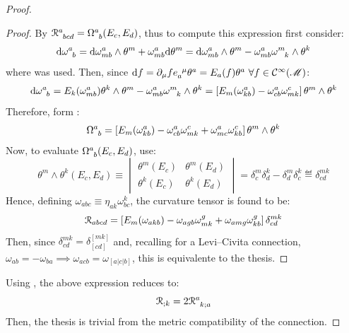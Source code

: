 \begin{proofbox}
\begin{proof}
    \begin{proofbox}
      \begin{proof}
        By  $ \tensor{\rr}{^a_{bcd}} = \tensor{\Omega}{^a_b}(E_c , E_d) $, thus to compute this expression first consider:
        \begin{equation*}
          \dd \tensor{\omega}{^a_b} = \dd \omega^a_{mb} \wedge \theta^m + \omega^a_{mb} \dd \theta^m = \dd \omega^a_{mb} \wedge \theta^m - \omega^a_{mb} \tensor{\omega}{^m_k} \wedge \theta^k
        \end{equation*}
        where  was used. Then, since $ \dd f = \pa_\mu f \tensor{e}{_a^\mu} \theta^a = E_a(f) \theta^a \,\, \forall f \in \cm $:
        \begin{equation*}
          \dd \tensor{\omega}{^a_b} = E_k(\omega^a_{mb}) \theta^k \wedge \theta^m - \omega^a_{mb} \tensor{\omega}{^m_k} \wedge \theta^k = \left[ E_m(\omega^a_{kb}) - \omega^a_{cb} \omega^c_{mk} \right] \theta^m \wedge \theta^k
        \end{equation*}
        Therefore, form :
        \begin{equation*}
          \tensor{\Omega}{^a_b} = \left[ E_m(\omega^a_{kb}) - \omega^a_{cb} \omega^c_{mk} + \omega^a_{mc} \omega^c_{kb} \right] \theta^m \wedge \theta^k
        \end{equation*}
        Now, to evaluate $ \tensor{\Omega}{^a_b}(E_c , E_d) $, use:
        \begin{equation*}
          \theta^m \wedge \theta^k (E_c , E_d) \equiv
          \begin{vmatrix}
            \theta^m(E_c) & \theta^m(E_d) \\ \theta^k(E_c) & \theta^k(E_d)
          \end{vmatrix}
          = \delta^m_c \delta^k_d - \delta^m_d \delta^k_c \eqdef \delta^{mk}_{cd}
        \end{equation*}
        Hence, defining $ \omega_{abc} \equiv \eta_{ak} \omega^k_{bc} $, the curvature tensor is found to be:
        \begin{equation*}
          \EuScript{R}_{abcd} = \left[ E_m(\omega_{akb}) - \omega_{agb} \omega^g_{mk} + \omega_{amg} \omega^g_{kb} \right] \delta^{mk}_{cd}
        \end{equation*}
        Then, since $ \delta^{mk}_{cd} = \delta^{[mk]}_{[cd]} $ and, recalling  for a Levi--Civita connection, $ \omega_{ab} = - \omega_{ba} \implies \omega_{acb} = \omega_{[a|c|b]} $, this is equivalente to the thesis.
      \end{proof}
    \end{proofbox}

    Using , the above expression reduces to:
    \begin{equation*}
      \rr_{;k} = 2 \tensor{\rr}{^a_{k;a}}
    \end{equation*}
    Then, the thesis is trivial from the metric compatibility of the connection.
  \end{proof}
\end{proofbox}

